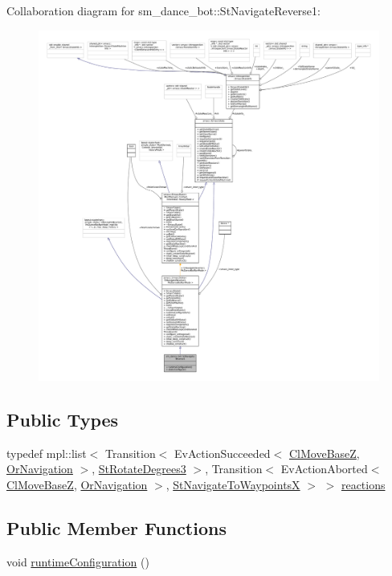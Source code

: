 Collaboration diagram for sm\+\_\+dance\+\_\+bot\+:\+:St\+Navigate\+Reverse1\+:
\nopagebreak
\begin{figure}[H]
\begin{center}
\leavevmode
\includegraphics[width=350pt]{structsm__dance__bot_1_1StNavigateReverse1__coll__graph}
\end{center}
\end{figure}
\subsection*{Public Types}
\begin{DoxyCompactItemize}
\item 
typedef mpl\+::list$<$ Transition$<$ Ev\+Action\+Succeeded$<$ \hyperlink{classmove__base__z__client_1_1ClMoveBaseZ}{Cl\+Move\+BaseZ}, \hyperlink{classsm__dance__bot_1_1OrNavigation}{Or\+Navigation} $>$, \hyperlink{structsm__dance__bot_1_1StRotateDegrees3}{St\+Rotate\+Degrees3} $>$, Transition$<$ Ev\+Action\+Aborted$<$ \hyperlink{classmove__base__z__client_1_1ClMoveBaseZ}{Cl\+Move\+BaseZ}, \hyperlink{classsm__dance__bot_1_1OrNavigation}{Or\+Navigation} $>$, \hyperlink{structsm__dance__bot_1_1StNavigateToWaypointsX}{St\+Navigate\+To\+WaypointsX} $>$ $>$ \hyperlink{structsm__dance__bot_1_1StNavigateReverse1_ab71f3a9d0c89ec34654dbffdcbc61c67}{reactions}
\end{DoxyCompactItemize}
\subsection*{Public Member Functions}
\begin{DoxyCompactItemize}
\item 
void \hyperlink{structsm__dance__bot_1_1StNavigateReverse1_a11161e1384ae9e00dce31ffb228e436c}{runtime\+Configuration} ()
\end{DoxyCompactItemize}
